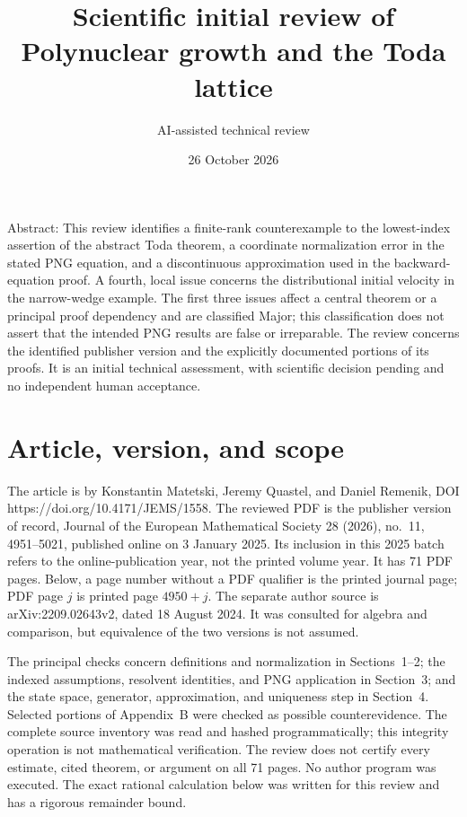 \documentclass[10pt]{article}
\title{Scientific initial review of
Polynuclear growth and the Toda lattice}
\author{AI-assisted technical review}
\date{26 October 2026}
\begin{document}
\maketitle
Abstract: This review identifies a finite-rank counterexample to the lowest-index assertion of the abstract Toda theorem, a coordinate normalization error in the stated PNG equation, and a discontinuous approximation used in the backward-equation proof. A fourth, local issue concerns the distributional initial velocity in the narrow-wedge example. The first three issues affect a central theorem or a principal proof dependency and are classified Major; this classification does not assert that the intended PNG results are false or irreparable. The review concerns the identified publisher version and the explicitly documented portions of its proofs. It is an initial technical assessment, with scientific decision pending and no independent human acceptance.\par
\section*{Article, version, and scope}
The article is by Konstantin Matetski, Jeremy Quastel, and Daniel Remenik, DOI https://doi.org/10.4171/JEMS/1558. The reviewed PDF is the publisher version of record, Journal of the European Mathematical Society 28 (2026), no. 11, 4951–5021, published online on 3 January 2025. Its inclusion in this 2025 batch refers to the online-publication year, not the printed volume year. It has 71 PDF pages. Below, a page number without a PDF qualifier is the printed journal page; PDF page \(j\) is printed page \(4950+j\). The separate author source is arXiv:2209.02643v2, dated 18 August 2024. It was consulted for algebra and comparison, but equivalence of the two versions is not assumed.\par
The principal checks concern definitions and normalization in Sections 1–2; the indexed assumptions, resolvent identities, and PNG application in Section 3; and the state space, generator, approximation, and uniqueness step in Section 4. Selected portions of Appendix B were checked as possible counterevidence. The complete source inventory was read and hashed programmatically; this integrity operation is not mathematical verification. The review does not certify every estimate, cited theorem, or argument on all 71 pages. No author program was executed. The exact rational calculation below was written for this review and has a rigorous remainder bound.\par
\end{document}
